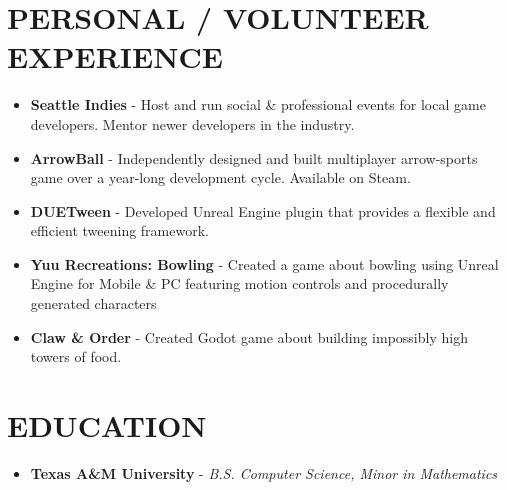 \documentclass[resmargin,10pt]{res} %
\begin{document}
\begin{resume}
    \section{PERSONAL / VOLUNTEER EXPERIENCE}
    \begin{itemize}
        \setlength\itemsep{-0.0em}
        \item \textbf{Seattle Indies} - Host and run social \& professional events for local game developers. Mentor newer developers in the industry.
        \item \textbf{ArrowBall} - Independently designed and built multiplayer arrow-sports game over a year-long development cycle. Available on Steam.
        \item \textbf{DUETween} - Developed Unreal Engine plugin that provides a flexible and efficient tweening framework.
        \item \textbf{Yuu Recreations: Bowling} - Created a game about bowling using Unreal Engine for Mobile \& PC featuring motion controls and procedurally generated characters
         \item \textbf{Claw \& Order} - Created Godot game about building impossibly high towers of food.
    \end{itemize}

    \section{EDUCATION}
    \begin{itemize}
        \setlength\itemsep{0.1em}
        \item[] {\bf Texas A\&M University} - \textit{B.S. Computer Science, Minor in Mathematics}
    \end{itemize}
\end{resume}
\end{document}
